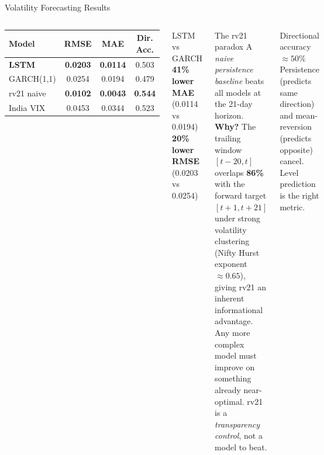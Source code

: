 \documentclass[aspectratio=169,10pt]{beamer}
\newcommand{\best}[1]{\cellcolor{teal!18}\textbf{#1}}
\begin{document}
\begin{frame}{Volatility Forecasting Results}
\begin{columns}[T]
\begin{center}
\small
\begin{tabular}{lccc}
\toprule
Model & RMSE & MAE & Dir. Acc. \\
\midrule
\best{LSTM} & \best{0.0203} & \best{0.0114} & 0.503 \\
GARCH(1,1) & 0.0254 & 0.0194 & 0.479 \\
rv21 naive & \cellcolor{orange!15}\textbf{0.0102} & \cellcolor{orange!15}\textbf{0.0043} & \cellcolor{orange!15}\textbf{0.544} \\
India VIX & 0.0453 & 0.0344 & 0.523 \\
\bottomrule
\end{tabular}
\end{center}
\vspace{0.5em}
\begin{exampleblock}{LSTM vs GARCH}
\textbf{41\% lower MAE} (0.0114 vs 0.0194)\\
\textbf{20\% lower RMSE} (0.0203 vs 0.0254)
\end{exampleblock}

\begin{alertblock}{The rv21 paradox}
A \emph{naive persistence baseline} beats all models at the 21-day horizon.\\[0.4em]
\textbf{Why?} The trailing window $[t\!-\!20,t]$ overlaps \textbf{86\%} with the forward target $[t\!+\!1,t\!+\!21]$ under strong volatility clustering (Nifty Hurst exponent $\approx 0.65$), giving rv21 an inherent informational advantage. Any more complex model must improve on something already near-optimal. 
rv21 is a \emph{transparency control}, not a model to beat.
\end{alertblock}
\begin{block}{Directional accuracy $\approx 50\%$}
Persistence (predicts same direction) and mean-reversion (predicts opposite) cancel. Level prediction is the right metric.
\end{block}
\end{columns}
\end{frame}
\end{document}
